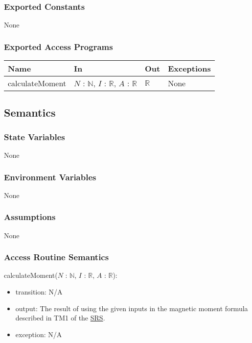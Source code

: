 \documentclass[12pt, titlepage]{article}
\begin{document}
\subsubsection{Exported Constants}
None

\subsubsection{Exported Access Programs}
\begin{center}
\begin{tabular}{p{3cm} p{4cm} p{4cm} p{3cm}}
\hline
\textbf{Name} & \textbf{In} & \textbf{Out} & \textbf{Exceptions} \\
\hline
calculateMoment & $N$ : $\mathbb{N}$, $I$ : $\mathbb{R}$, $A$ : $\mathbb{R}$  & $\mathbb{R}$ & None \\
\hline
\end{tabular}
\end{center}

\subsection{Semantics}

\subsubsection{State Variables}
None

\subsubsection{Environment Variables}
None

\subsubsection{Assumptions}
None 

\subsubsection{Access Routine Semantics}

\noindent calculateMoment($N$ : $\mathbb{N}$, $I$ : $\mathbb{R}$, $A$ : $\mathbb{R}$):
\begin{itemize}
\item transition: N/A
\item output: The result of using the given inputs in the magnetic moment formula described in TM1 of the \href{https://github.com/husseinsd1/optimal-em-arrangement/blob/main/docs/SRS/SRS.pdf}{SRS}.
\item exception: N/A
\end{itemize}
\end{document}
